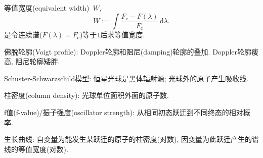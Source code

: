 等值宽度(equivalent width)~$W$,
\begin{equation*}
    W:=\int\frac{F_\text{c}-F(\lambda)}{F_\text{c}}\,\mathrm{d}\lambda.
\end{equation*}
是令连续谱($F(\lambda)=F_\text{c}$)等于$1$后求等值宽度.

佛脱轮廓(Voigt profile): Doppler轮廓和阻尼(damping)轮廓的叠加. Doppler轮廓瘦高, 阻尼轮廓矮胖.

Schuster-Schwarzschild模型: 恒星光球是黑体辐射源; 光球外的原子产生吸收线.

柱密度(column density): 光球单位面积外面的原子数.

f值(f-value)/振子强度(oscillator strength): 从相同初态跃迁到不同终态的相对概率.

生长曲线: 自变量为能发生某跃迁的原子的柱密度(对数), 因变量为此跃迁产生的谱线的等值宽度(对数).
